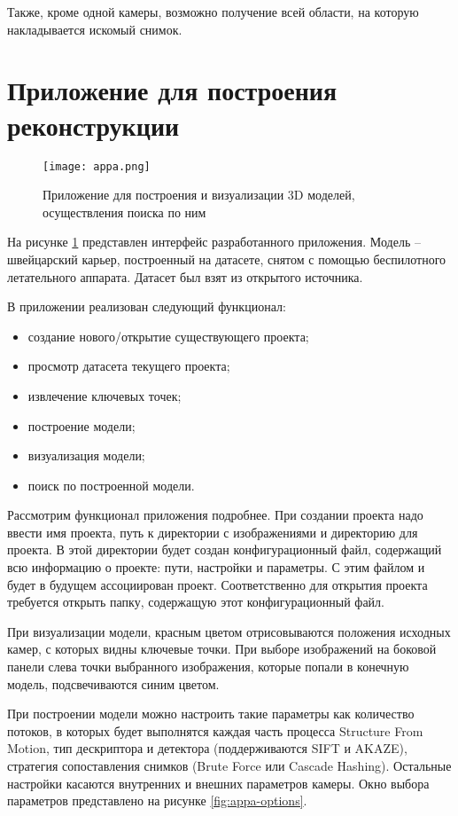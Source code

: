 Также, кроме одной камеры, возможно получение всей области, на которую накладывается искомый снимок.

\section{Приложение для построения реконструкции}

\begin{figure}[h]
    \centering
    \texttt{[image: appa.png]}
    \caption{Приложение для построения и визуализации 3D моделей, осуществления поиска по ним}
    \label{fig:appa}
\end{figure}

На рисунке \ref{fig:appa} представлен интерфейс разработанного приложения. Модель -- швейцарский карьер, построенный на датасете, снятом с помощью беспилотного летательного аппарата. Датасет был взят из открытого источника.

В приложении реализован следующий функционал:
\begin{itemize}
    \item создание нового/открытие существующего проекта;
    \item просмотр датасета текущего проекта;
    \item извлечение ключевых точек;
    \item построение модели;
    \item визуализация модели;
    \item поиск по построенной модели.
\end{itemize}

Рассмотрим функционал приложения подробнее. При создании проекта надо ввести имя проекта, путь к директории с изображениями и директорию для проекта. В этой директории будет создан конфигурационный файл, содержащий всю информацию о проекте: пути, настройки и параметры. С этим файлом и будет в будущем ассоциирован проект. Соответственно для открытия проекта требуется открыть папку, содержащую этот конфигурационный файл.

При визуализации модели, красным цветом отрисовываются положения исходных камер, с которых видны ключевые точки. При выборе изображений на боковой панели слева точки выбранного изображения, которые попали в конечную модель, подсвечиваются синим цветом.

При построении модели можно настроить такие параметры как количество потоков, в которых будет выполнятся каждая часть процесса Structure From Motion, тип дескриптора и детектора (поддерживаются SIFT и AKAZE), стратегия сопоставления снимков (Brute Force или Cascade Hashing). Остальные настройки касаются внутренних и внешних параметров камеры. Окно выбора параметров представлено на рисунке \ref{fig:appa-options}.


